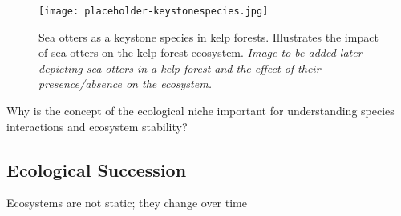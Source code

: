 \begin{figure}[h]
    \texttt{[image: placeholder-keystonespecies.jpg]}
    \caption{Sea otters as a keystone species in kelp forests.  Illustrates the impact of sea otters on the kelp forest ecosystem. \textit{Image to be added later depicting sea otters in a kelp forest and the effect of their presence/absence on the ecosystem.}}
\end{figure}

\begin{stopandthink}
Why is the concept of the ecological niche important for understanding species interactions and ecosystem stability?
\end{stopandthink}

\subsection{Ecological Succession}

Ecosystems are not static; they change over time